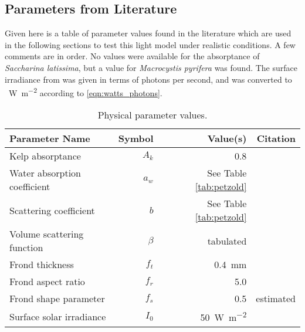 \subsection{Parameters from Literature}
Given here is a table of parameter values found in the literature which are used in the following sections to test this light model under realistic conditions.
A few comments are in order.
No values were available for the absorptance of \textit{Saccharina latissima}, but a value for \textit{Macrocystis pyrifera} was found.
The surface irradiance from \cite{broch_modelling_2012} was given in terms of photons per second,
and was converted to \SI{}{\W\per\m\squared} according to \eqref{eqn:watts_photons}.

\begin{table}[h]
  \centering
  \caption{Physical parameter values.}
  \begin{tabular}{lrrr}
    \toprule
    Parameter Name & Symbol & Value(s) & Citation \\ %
    \midrule
    Kelp absorptance & $A_k$ & 0.8 & \cite{colombo-pallotta_photosynthetic_2006} \\%
    Water absorption coefficient & $a_w$ & See Table \ref{tab:petzold} & \cite{petzold_volume_1972} \\%
    Scattering coefficient & $b$  & See Table \ref{tab:petzold} & \cite{petzold_volume_1972} \\%
    Volume scattering function & $\beta$ & tabulated & \cite{petzold_volume_1972,sokolov_parameterization_2010} \\%
    Frond thickness & $f_t$ & \SI{0.4}{\mm} & \cite{foldal_morphological_2018} \\
    Frond aspect ratio & $f_r$ & 5.0 & \cite{foldal_morphological_2018} \\
    Frond shape parameter & $f_s$ & 0.5 & estimated \\
    Surface solar irradiance & $I_0$ & \SI{50}{\W\per\m\squared} & \cite{broch_modelling_2012}  \\%
    \bottomrule
  \end{tabular}
  \label{tab:params}
\end{table}

